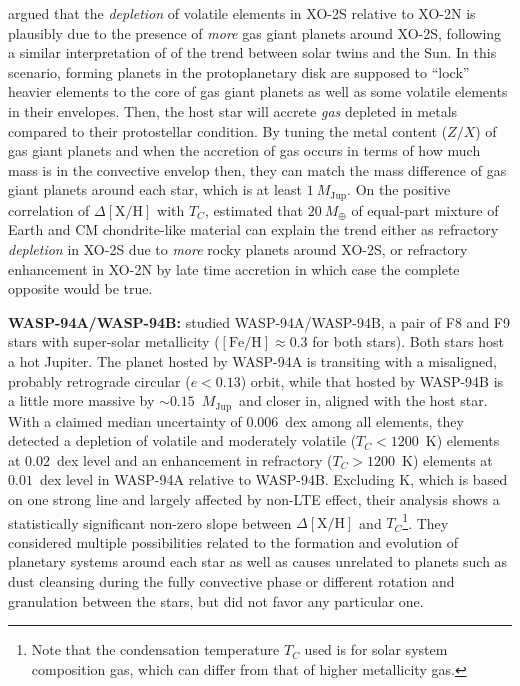 \documentclass[modern, letterpaper]{aastex61}
\newcommand*\elem[1]{\ensuremath{\mathrm{#1}}}
\newcommand*\elemH[1]{\ensuremath{[\mathrm{#1}/\elem{H}]}}
\newcommand*{\feh}{\ensuremath{\elemH{Fe}}}
\newcommand{\Tcondens}{\ensuremath{T_C}}
\newcommand{\mearth}{\ensuremath{M_\oplus}}
\newcommand{\mjupiter}{\ensuremath{M_\mathrm{Jup}}}
\begin{document}
\citealt{Ramirez:2015aa} argued that the {\it depletion} of volatile elements
in XO-2S relative to XO-2N is plausibly due to the presence of {\it more} gas
giant planets around XO-2S, following a similar interpretation of
\citealt{Melendez:2009aa} of the trend between solar twins and the Sun.
In this scenario, forming planets in the protoplanetary disk are supposed to
``lock'' heavier elements to the core of gas giant planets as well as some
volatile elements in their envelopes. Then, the host star will accrete {\it
  gas} depleted in metals compared to their protostellar condition.
By tuning the metal content ($Z/X$) of gas giant planets and when the accretion
of gas occurs in terms of how much mass is in the convective envelop then, they
can match the mass difference of gas giant planets around each star, which is
at least $1~\mjupiter$.
On the positive correlation of $\Delta\elemH{X}$ with \Tcondens,
\citealt{Ramirez:2015aa} estimated that $20~\mearth$ of equal-part mixture of
Earth and CM chondrite-like material can explain the trend either as refractory
{\it depletion} in XO-2S due to {\it more} rocky planets around XO-2S, or
refractory enhancement in XO-2N by late time accretion in which case the
complete opposite would be true.


{\bf WASP-94A/WASP-94B:}
\citealt{Teske:2016aa} studied WASP-94A/WASP-94B, a pair of F8 and F9 stars
with super-solar metallicity ($\feh\approx 0.3$ for both stars). Both stars
host a hot Jupiter.
The planet hosted by WASP-94A is transiting with a misaligned, probably
retrograde circular ($e<0.13$) orbit, while that hosted by WASP-94B is a little
more massive by $\sim 0.15$~\mjupiter\ and closer in, aligned with the host
star.
With a claimed median uncertainty of $0.006$~dex among all elements, they
detected a depletion of volatile and moderately volatile ($\Tcondens < 1200$~K)
elements at $0.02$~dex level and an enhancement in refractory ($\Tcondens >
1200$~K) elements at $0.01$~dex level in WASP-94A relative to WASP-94B.
Excluding K, which is based on one strong line and largely affected by non-LTE
effect, their analysis shows a statistically significant non-zero slope between
$\Delta\elemH{X}$ and $\Tcondens$\footnote{
  Note that the condensation
  temperature $\Tcondens$ used is for solar system composition
  gas, which can differ from that of higher metallicity gas.}.
They considered multiple possibilities related to the formation and evolution
of planetary systems around each star as well as causes unrelated to planets
such as dust cleansing during the fully convective phase or different rotation
and granulation between the stars, but did not favor any particular one.
\end{document}
